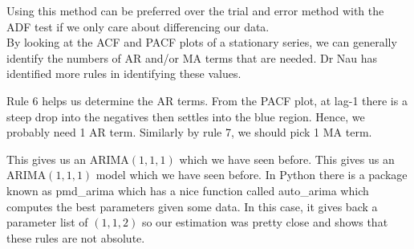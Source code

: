 \documentclass{article}
\begin{document}
  Using this method can be preferred over the trial and error method with the ADF test if we only care about differencing our data.\\
  By looking at the ACF and PACF plots of a stationary series, we can generally identify the numbers of AR and/or MA terms that are needed. Dr Nau has identified more rules in identifying these values.
  \newline
  \newline
  \emph{\\
  }
  \newline

  Rule 6 helps us determine the AR terms. From the PACF plot, at lag-1 there is a steep drop into the negatives then settles into the blue region. Hence, we probably need 1 AR term. Similarly by rule 7, we should pick 1 MA term.

  This gives us an ARIMA$(1,1,1)$ which we have seen before. This gives us an ARIMA$(1,1,1)$ model which we have seen before. In Python there is a package known as pmd\_arima which has a nice function called auto\_arima which computes the best parameters given some data. In this case, it gives back a parameter list of $(1,1,2)$ so our estimation was pretty close and shows that these rules are not absolute.
  
\end{document}
